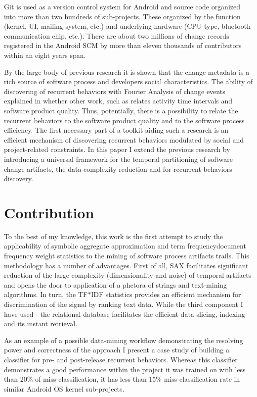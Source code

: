 \documentclass[10pt, conference, compsocconf]{IEEEtran}
\begin{document}
Git is used as a version control system for Android and source code organized into more than 
two hundreds of sub-projects. These organized by the function (kernel, UI, mailing system, etc.) and underlying hardware 
(CPU type, bluetooth communication chip, etc.). 
There are about two millions of change records registered in the Android SCM by more than 
eleven thousands of contributors within an eight years span.

By the large body of previous research it is shown that the change metadata is a rich 
source of software process and developers social characteristics. The ability of 
discovering of recurrent behaviors with Fourier Analysis of change events 
explained in \cite{citeulike:10377345} whether other work, such as \cite{citeulike:10392277}
relates activity time intervals and software product quality. Thus, potentially,
there is a possibility to relate the recurrent behaviors to the software product 
quality and to the software process efficiency. The first necessary part of a toolkit
aiding such a research is an efficient mechanism of discovering recurrent behaviors
modulated by social and project-related constraints. In this paper I extend the 
previous research by introducing a universal framework for the temporal 
partitioning of software change artifacts, the data complexity reduction 
and for recurrent behaviors discovery.

\section{Contribution}
To the best of my knowledge, this work is the first attempt to study the applicability
of symbolic aggregate approximation and term frequency\textendash document frequency
weight statistics to the mining of software process artifacts trails. 
This methodology has a number of advantages. First of all, SAX facilitates significant 
reduction of the large complexity (dimensionality and noise) of temporal artifacts 
and opens the door to application of a phetora of strings and text-mining algorithms.
In turn, the TF$\ast$IDF statistics provides an efficient mechanism for 
discrimination of the signal by ranking text data. While the third component I have 
used - the relational database facilitates the efficient data slicing, indexing
and its instant retrieval.

As an example of a possible data-mining workflow demonstrating the resolving power 
and correctness of the approach I present a case study of building a classifier
for pre- and post-release recurrent behaviors. 
Whereas this classifier demonstrates a good performance within the project it was 
trained on with less than 20\% of miss-classification, it has less than 15\% 
miss-classification rate in similar Android OS kernel sub-projects.
\end{document}
